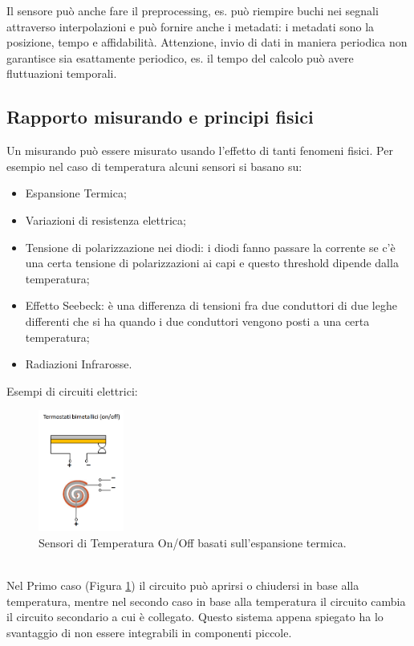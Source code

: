 \documentclass[11pt, twocolumn]{article}
\newenvironment{myitemize}
{ \begin{itemize}[topsep=0ex]
		\setlength{\itemsep}{0pt}
		\setlength{\parskip}{0pt}
		\setlength{\parsep}{0pt}     }
	{ \end{itemize}                  }
\begin{document}
Il sensore può anche fare il preprocessing, es. può riempire buchi nei segnali attraverso interpolazioni e può fornire anche i metadati: i metadati sono la posizione, tempo e affidabilità.
Attenzione, invio di dati in maniera periodica non garantisce sia esattamente periodico, es. il tempo del calcolo può avere fluttuazioni temporali.\\
\vspace{-0.5cm}
\subsection{Rapporto misurando e principi fisici}
Un misurando può essere misurato usando l'effetto di tanti fenomeni fisici.
Per esempio nel caso di temperatura alcuni sensori si basano su:
\begin{myitemize}
  \item Espansione Termica;
  \item Variazioni di resistenza elettrica;
  \item Tensione di polarizzazione nei diodi: i diodi fanno passare la corrente se c'è una certa tensione di polarizzazioni ai capi e questo threshold dipende dalla temperatura;
  \item Effetto Seebeck: è una differenza di tensioni fra due conduttori di due leghe differenti che si ha quando i due conduttori vengono posti a una certa temperatura;
  \item Radiazioni Infrarosse.
\end{myitemize}
Esempi di circuiti elettrici:\\
\begin{figure}[!h]
  \centering
  \includegraphics[width=\linewidth,height=4cm]{imgs/on_off.png}
  \caption{Sensori di Temperatura On/Off basati sull'espansione termica.}
  \label{fig:on_off}
\end{figure}\\
Nel Primo caso (Figura \ref{fig:on_off}) il circuito può aprirsi o chiudersi in base alla temperatura, mentre nel secondo caso in base alla temperatura il circuito cambia il circuito secondario a cui è collegato. 
Questo sistema appena spiegato ha lo svantaggio di non essere integrabili in componenti piccole.\\
\end{document}
